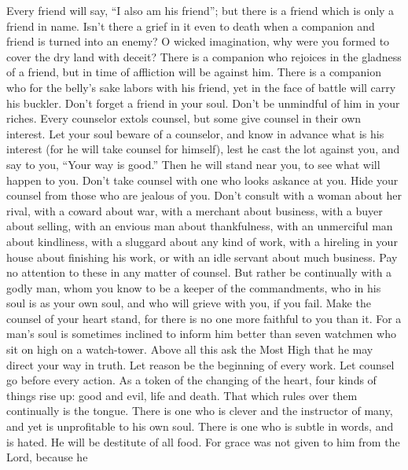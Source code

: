  Every friend will say, ``I also am his friend''; but
there is a friend which is only a friend in name.  Isn't
there a grief in it even to death when a companion and friend is turned
into an enemy?  O wicked imagination, why were you formed
to cover the dry land with deceit?  There is a companion
who rejoices in the gladness of a friend, but in time of affliction will
be against him.  There is a companion who for the belly's
sake labors with his friend, yet in the face of battle will carry his
buckler.  Don't forget a friend in your soul. Don't be
unmindful of him in your riches.  Every counselor extols
counsel, but some give counsel in their own interest.  Let
your soul beware of a counselor, and know in advance what is his
interest (for he will take counsel for himself), lest he cast the lot
against you,  and say to you, ``Your way is good.'' Then
he will stand near you, to see what will happen to you. 
Don't take counsel with one who looks askance at you. Hide your counsel
from those who are jealous of you.  Don't consult with a
woman about her rival, with a coward about war, with a merchant about
business, with a buyer about selling, with an envious man about
thankfulness, with an unmerciful man about kindliness, with a sluggard
about any kind of work, with a hireling in your house about finishing
his work, or with an idle servant about much business. Pay no attention
to these in any matter of counsel.  But rather be
continually with a godly man, whom you know to be a keeper of the
commandments, who in his soul is as your own soul, and who will grieve
with you, if you fail.  Make the counsel of your heart
stand, for there is no one more faithful to you than it. 
For a man's soul is sometimes inclined to inform him better than seven
watchmen who sit on high on a watch-tower.  Above all
this ask the Most High that he may direct your way in truth.
 Let reason be the beginning of every work. Let counsel
go before every action.  As a token of the changing of
the heart,  four kinds of things rise up: good and evil,
life and death. That which rules over them continually is the tongue.
 There is one who is clever and the instructor of many,
and yet is unprofitable to his own soul.  There is one
who is subtle in words, and is hated. He will be destitute of all food.
 For grace was not given to him from the Lord, because he
